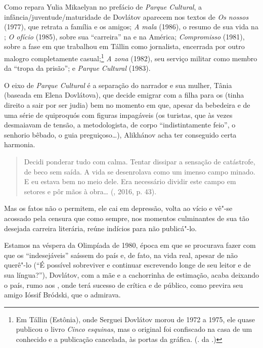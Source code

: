 Como repara Yulia Mikaelyan no prefácio de \emph{Parque Cultural}, a infância/juventude/maturidade
de Dovlátov aparecem nos textos de \emph{Os
nossos} (1977), que retrata a família e os amigos; \emph{A mala} (1986), o resumo
de sua vida na ; \emph{O ofício} (1985), sobre sua
``carreira'' na  e na América; \emph{Compromisso} (1981),
sobre a fase em que trabalhou em Tállin como jornalista, encerrada por
outro malogro completamente casual;\footnote{Em Tállin (Estônia), onde Serguei Dovlátov morou
 de 1972 a 1975, ele quase publicou o livro \emph{Cinco esquinas},
 mas o original foi confiscado na casa de um conhecido e a publicação
 cancelada, às portas da gráfica. (. da .)} \emph{A zona} (1982), seu serviço
militar como membro da ``tropa da prisão''; e \emph{Parque Cultural} (1983).

O eixo de \emph{Parque Cultural} é a separação do narrador e sua mulher,
Tânia (baseada em Elena Dovlátova), que decide emigrar com a filha para os  (tinha direito a sair por ser judia)
bem no momento em que, apesar da bebedeira e de uma
série de quiproquós com figuras impagáveis (os turistas, que às vezes
desmaiavam de tensão, a metodologista, de corpo ``indistintamente feio'', o
senhorio bêbado, o guia preguiçoso\ldots{}), Alikhánov acha ter conseguido
certa harmonia.

\begin{quotation}
Decidi ponderar tudo com calma. Tentar dissipar a
sensação de catástrofe, de beco sem saída. A vida se desenrolava como um
imenso campo minado. E eu estava bem no meio dele. Era necessário
dividir este campo em setores e pôr mãos à obra\ldots{} (, 2016, p. 43).
\end{quotation} 

Mas os fatos não o permitem, ele cai em depressão, volta ao vício e vê"-se acossado pela
censura que como sempre, nos momentos culminantes de sua tão desejada
carreira literária, reúne indícios para não publicá"-lo. 

Estamos na véspera da Olimpíada de 1980, época em que se procurava fazer com que
os ``indesejáveis'' saíssem do país e, de fato, na vida real,
apesar de não querê"-lo (``É possível sobreviver e continuar escrevendo
longe de seu leitor e de sua língua?''), Dovlátov, com a mãe e a
cachorrinha de estimação, acaba deixando o país, rumo aos , onde terá sucesso de crítica
e de público, como previra seu amigo Ióssif Bródski, que o admirava.

